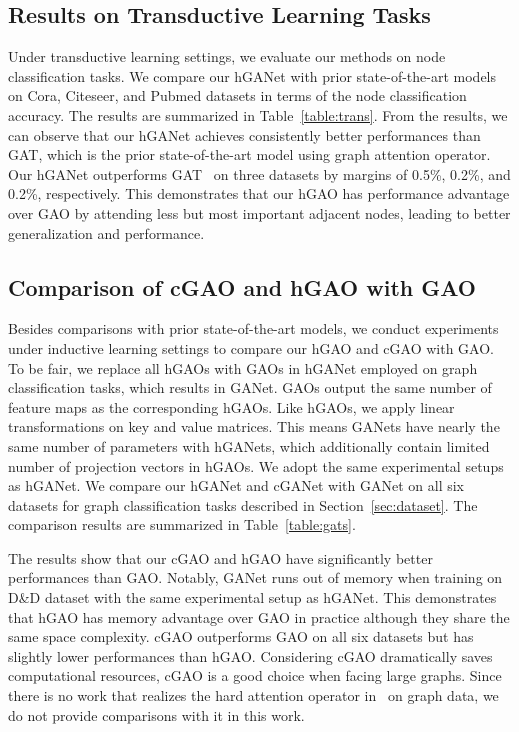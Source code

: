\documentclass[sigconf]{acmart}
\begin{document}
\subsection{Results on Transductive Learning Tasks}

Under transductive learning settings, we evaluate our methods on node
classification tasks. We compare our hGANet with prior state-of-the-art models
on Cora, Citeseer, and Pubmed datasets in terms of the node classification
accuracy. The results are summarized in Table~\ref{table:trans}. From the
results, we can observe that our hGANet achieves consistently better
performances than GAT, which is the prior state-of-the-art model using graph
attention operator. Our hGANet outperforms GAT~\cite{velivckovic2017graph} on
three datasets by margins of 0.5\%, 0.2\%, and 0.2\%, respectively. This
demonstrates that our hGAO has performance advantage over GAO by attending
less but most important adjacent nodes, leading to better generalization and
performance.


\subsection{Comparison of cGAO and hGAO with GAO}

Besides comparisons with prior state-of-the-art models, we conduct experiments
under inductive learning settings to compare our hGAO and cGAO with GAO. To be
fair, we replace all hGAOs with GAOs in hGANet employed on graph
classification tasks, which results in GANet. GAOs output the same number of
feature maps as the corresponding hGAOs. Like hGAOs, we apply linear
transformations on key and value matrices. This means GANets have nearly the
same number of parameters with hGANets, which additionally contain limited
number of projection vectors in hGAOs. We adopt the same experimental setups
as hGANet. We compare our hGANet and cGANet with GANet on all six datasets for
graph classification tasks described in Section~\ref{sec:dataset}. The
comparison results are summarized in Table~\ref{table:gats}.

The results show that our cGAO and hGAO have significantly better performances
than GAO. Notably, GANet runs out of memory when training on D\&D dataset with
the same experimental setup as hGANet. This demonstrates that hGAO has memory
advantage over GAO in practice although they share the same space complexity.
cGAO outperforms GAO on all six datasets but has slightly lower performances
than hGAO. Considering cGAO dramatically saves computational resources, cGAO is
a good choice when facing large graphs. Since there is no work that realizes
the hard attention operator in~\cite{xu2015show} on graph data, we do not
provide comparisons with it in this work.
\end{document}
